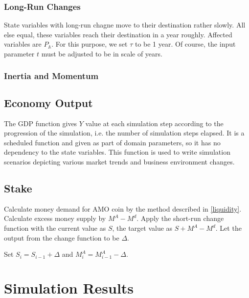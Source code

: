 \documentclass[a4paper,11pt]{scrartcl}
\newcommand{\amom}{\mathbb{A}}
\begin{document}
\subsubsection{Long-Run Changes}
State variables with long-run chagne move to their destination rather slowly.
All else equal, these variables reach their destination in a year roughly.
Affected variables are $P_\amom$. For this purpose, we set $\tau$ to be 1 year.
Of course, the input parameter $t$ must be adjusted to be in scale of years.

\subsubsection{Inertia and Momentum}

\subsection{Economy Output}
The GDP function gives $Y$ value at each simulation step according to the
progression of the simulation, i.e. the number of simulation steps elapsed. It
is a scheduled function and given as part of domain parameters, so it has no
dependency to the state variables. This function is used to write simulation
scenarios depicting various market trends and business environment changes.

\subsection{Stake}
Calculate money demand for AMO coin by the method described in
\ref{liquidity}. Calculate excess money supply by $M^A - M^d$. Apply the
short-run change function with the current value as $S$, the target value as
$S + M^A - M^d$. Let the output from the change function to be $\Delta$.

Set $S_i = S_{i-1} + \Delta$ and $M^A_i = M^A_{i-1} - \Delta$.

\section{Simulation Results}
\end{document}

